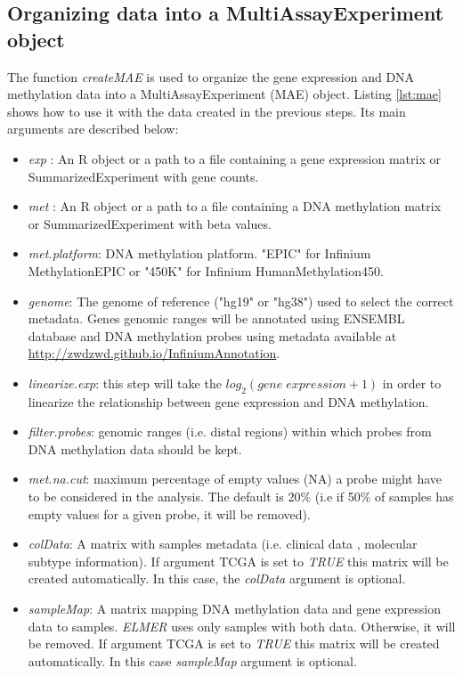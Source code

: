 

\subsection*{Organizing data into a MultiAssayExperiment object}
The function \textit{createMAE} is used to organize the gene expression and
 DNA methylation data into a MultiAssayExperiment (MAE) object. Listing \ref{lst:mae}
 shows how to use it with the data created in the previous steps.
  Its main arguments are described below:

\begin{itemize}
\item \textit{exp} : An R object or a path to a file containing a gene expression
    matrix or SummarizedExperiment with gene counts.
\item \textit{met} : An R object or a path to a file containing a DNA methylation
    matrix or SummarizedExperiment with beta values.
\item \textit{met.platform}: DNA methylation platform.
    "EPIC" for Infinium MethylationEPIC or "450K" for
    Infinium HumanMethylation450.
 \item \textit{genome}: The genome of reference ("hg19" or "hg38")
    used to select the correct metadata. Genes genomic ranges will be annotated
    using ENSEMBL database and DNA methylation probes
    using metadata available at \url{http://zwdzwd.github.io/InfiniumAnnotation}.
 \item \textit{linearize.exp}: this step will take the $log_2(gene\; expression + 1)$
    in order to linearize the relationship between
    gene expression and DNA methylation.
 \item \textit{filter.probes}: genomic ranges (i.e. distal
    regions) within which  probes from
    DNA methylation data should be kept.
 \item \textit{met.na.cut}: maximum percentage of empty values (NA) a probe might have to be
    considered in the analysis. The default is 20\% (i.e if 50\% of samples has empty values  for a given
    probe, it will be removed).
 \item \textit{colData}: A matrix  with samples metadata (i.e. clinical data ,
    molecular  subtype information). If argument TCGA is set to \textit{TRUE}
    this matrix will be created automatically. In this case, the \textit{colData}
    argument is optional.
 \item \textit{sampleMap}: A matrix mapping DNA methylation data and gene expression
    data to samples. \textit{ELMER} uses only samples with both data.
    Otherwise,  it will be removed. If argument TCGA is set to \textit{TRUE}
    this matrix will be created automatically. In this case \textit{sampleMap}
    argument is optional.
\end{itemize}

